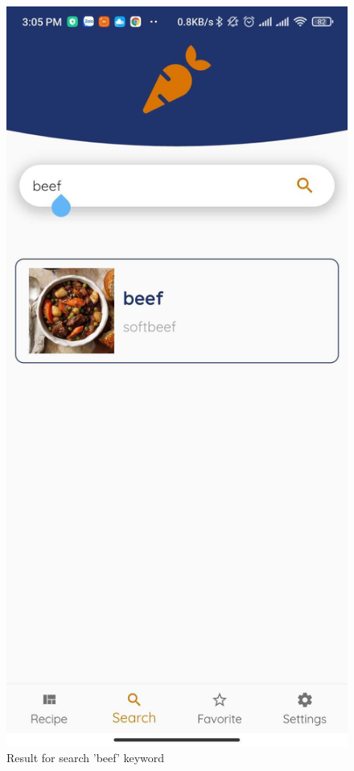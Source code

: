 \documentclass{article}
\begin{document}
\begin{figure}[h!]
    \includegraphics[scale=0.1]{Images/search1.jpg}
    
    \caption{Result for search 'beef' keyword}
    
    \label{fig:cookingbook}
    \end{figure}
    \newpage 
    
\end{document}
